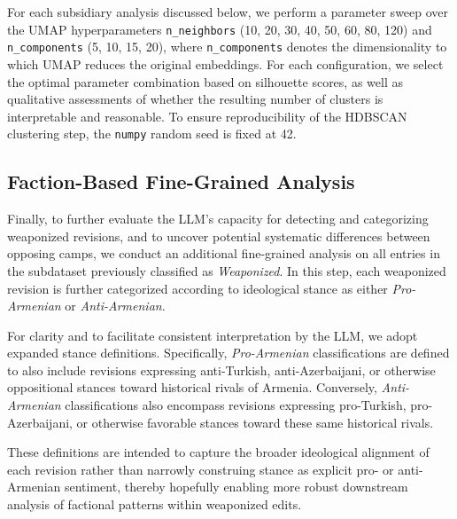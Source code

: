 \documentclass[11pt, a4paper, twoside, openright]{article} %
\begin{document}
For each subsidiary analysis discussed below, we perform a parameter sweep over the UMAP hyperparameters \texttt{n\_neighbors} (10, 20, 30, 40, 50, 60, 80, 120) and \texttt{n\_components} (5, 10, 15, 20), where \texttt{n\_components} denotes the dimensionality to which UMAP reduces the original embeddings. For each configuration, we select the optimal parameter combination based on silhouette scores, as well as qualitative assessments of whether the resulting number of clusters is interpretable and reasonable. To ensure reproducibility of the HDBSCAN clustering step, the \texttt{numpy} random seed is fixed at 42.


\subsection{Faction-Based Fine-Grained Analysis}

Finally, to further evaluate the LLM’s capacity for detecting and categorizing weaponized revisions, and to uncover potential systematic differences between opposing camps, we conduct an additional fine-grained analysis on all entries in the subdataset previously classified as \textit{Weaponized}. In this step, each weaponized revision is further categorized according to ideological stance as either \textit{Pro-Armenian} or \textit{Anti-Armenian}.

For clarity and to facilitate consistent interpretation by the LLM, we adopt expanded stance definitions. Specifically, \textit{Pro-Armenian} classifications are defined to also include revisions expressing anti-Turkish, anti-Azerbaijani, or otherwise oppositional stances toward historical rivals of Armenia. Conversely, \textit{Anti-Armenian} classifications also encompass revisions expressing pro-Turkish, pro-Azerbaijani, or otherwise favorable stances toward these same historical rivals.

These definitions are intended to capture the broader ideological alignment of each revision rather than narrowly construing stance as explicit pro- or anti-Armenian sentiment, thereby hopefully enabling more robust downstream analysis of factional patterns within weaponized edits.
\end{document}
